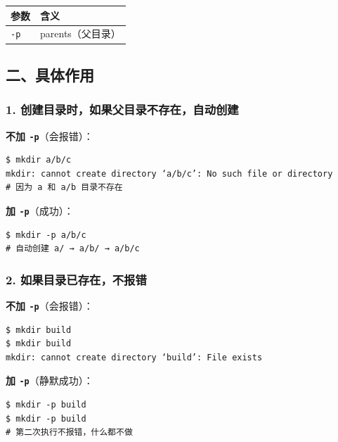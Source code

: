 \documentclass[11pt, a4paper]{article}
\begin{document}
\begin{aibox}
\vspace{0.5em}
\begin{tabularx}{\textwidth}{@{} l X @{}}
\toprule
参数 & 含义 \\
\midrule
\texttt{-p} & parents（父目录） \\
\bottomrule
\end{tabularx}
\vspace{0.5em}

\subsection*{二、具体作用}

\subsubsection*{1. 创建目录时，如果父目录不存在，自动创建}
\textbf{不加 \texttt{-p}}（会报错）：
\begin{tcolorbox}[colback=white,colframe=gray!50!white,boxrule=0.5pt,arc=2pt,left=5pt,right=5pt,top=5pt,bottom=5pt]
\begin{verbatim}
$ mkdir a/b/c
mkdir: cannot create directory ‘a/b/c’: No such file or directory
# 因为 a 和 a/b 目录不存在
\end{verbatim}
\end{tcolorbox}

\textbf{加 \texttt{-p}}（成功）：
\begin{tcolorbox}[colback=white,colframe=gray!50!white,boxrule=0.5pt,arc=2pt,left=5pt,right=5pt,top=5pt,bottom=5pt]
\begin{verbatim}
$ mkdir -p a/b/c
# 自动创建 a/ → a/b/ → a/b/c
\end{verbatim}
\end{tcolorbox}

\subsubsection*{2. 如果目录已存在，不报错}
\textbf{不加 \texttt{-p}}（会报错）：
\begin{tcolorbox}[colback=white,colframe=gray!50!white,boxrule=0.5pt,arc=2pt,left=5pt,right=5pt,top=5pt,bottom=5pt]
\begin{verbatim}
$ mkdir build
$ mkdir build
mkdir: cannot create directory ‘build’: File exists
\end{verbatim}
\end{tcolorbox}

\textbf{加 \texttt{-p}}（静默成功）：
\begin{tcolorbox}[colback=white,colframe=gray!50!white,boxrule=0.5pt,arc=2pt,left=5pt,right=5pt,top=5pt,bottom=5pt]
\begin{verbatim}
$ mkdir -p build
$ mkdir -p build
# 第二次执行不报错，什么都不做
\end{verbatim}
\end{tcolorbox}


\end{aibox}
\end{document}

